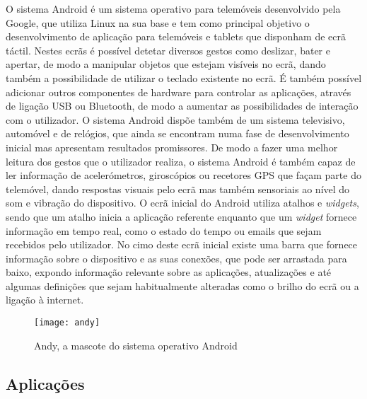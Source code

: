 O sistema Android é um sistema operativo para telemóveis desenvolvido pela Google, que utiliza Linux na sua base e tem como principal objetivo o desenvolvimento de aplicação para telemóveis e tablets que disponham de ecrã táctil.
Nestes ecrãs é possível detetar diversos gestos como deslizar, bater e apertar, de modo a manipular objetos que estejam visíveis no ecrã, dando também a possibilidade de utilizar o teclado existente no ecrã.
É também possível adicionar outros componentes de hardware para controlar as aplicações, através de ligação USB ou Bluetooth, de modo a aumentar as possibilidades de interação com o utilizador.
O sistema Android dispõe também de um sistema televisivo, automóvel e de relógios, que ainda se encontram numa fase de desenvolvimento inicial mas apresentam resultados promissores.
De modo a fazer uma melhor leitura dos gestos que o utilizador realiza, o sistema Android é também capaz de ler informação de acelerómetros, giroscópios ou recetores GPS que façam parte do telemóvel, dando respostas visuais pelo ecrã mas também sensoriais ao nível do som e vibração do dispositivo.
O ecrã inicial do Android utiliza atalhos e \emph{widgets}, sendo que um atalho inicia a aplicação referente enquanto que um \emph{widget} fornece informação em tempo real, como o estado do tempo ou emails que sejam recebidos pelo utilizador.
No cimo deste ecrã inicial existe uma barra que fornece informação sobre o dispositivo e as suas conexões, que pode ser arrastada para baixo, expondo informação relevante sobre as aplicações, atualizações e até algumas definições que sejam habitualmente alteradas como o brilho do ecrã ou a ligação à internet.

\begin{figure}[hbtp]
	\centering
	\texttt{[image: andy]}
	\caption[Andy, a mascote do sistema operativo Android]{Andy, a mascote do sistema operativo Android\footnotemark}
	\label{fig:andy}
\end{figure}

\subsection{Aplicações}
\label{sub:aplicacoes}

